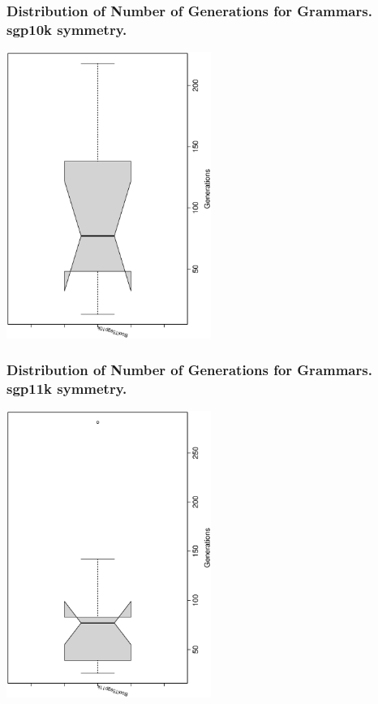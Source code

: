 \documentclass[18pt,c]{beamer}
\begin{document}
 \begin{frame}
 \frametitle{ Distribution of Number of Generations for Grammars. sgp10k  symmetry. }
 \begin{center}
\includegraphics[width=0.5\textwidth, angle=-90]
{ExpFboxplottGenerations008.eps}
 \end{center}
 \label{ExpFboxplottGenerations008.eps}  
 \end{frame}

 \begin{frame}
 \frametitle{ Distribution of Number of Generations for Grammars. sgp11k  symmetry. }
 \begin{center}
\includegraphics[width=0.5\textwidth, angle=-90]
{ExpFboxplottGenerations009.eps}
 \end{center}
 \label{ExpFboxplottGenerations009.eps}  
 \end{frame}
\end{document}
